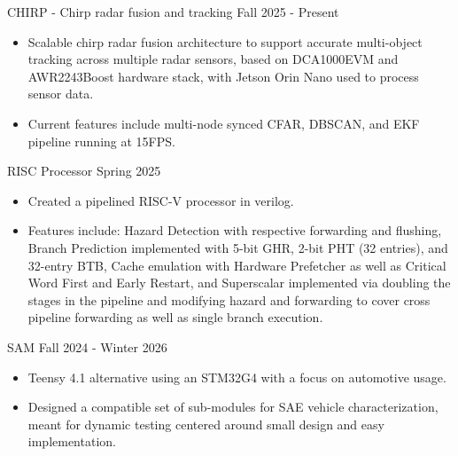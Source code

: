 \documentclass[9pt]{developercv} %
\begin{document}
\vspace{-16 pt}
\begin{entrylist}
    \entry
    {}
    {CHIRP - Chirp radar fusion and tracking }
    {Fall 2025 - Present}
    {\vspace{-4pt}
    \begin{itemize}[noitemsep,topsep=0pt,parsep=0pt,partopsep=0pt, leftmargin=10pt]
        \item Scalable chirp radar fusion architecture to support accurate multi-object tracking across multiple radar sensors, based on DCA1000EVM and AWR2243Boost hardware stack, with Jetson Orin Nano used to process sensor data. 
        \item Current features include multi-node synced CFAR, DBSCAN, and EKF pipeline running at 15FPS. 
    \end{itemize}
    }
    
    \entry
    {}
    {RISC Processor}
    {Spring 2025}
    {\vspace{-4pt}
    \begin{itemize}[noitemsep,topsep=0pt,parsep=0pt,partopsep=0pt, leftmargin=10pt]
    \item Created a pipelined RISC-V processor in verilog.
    \item Features include: Hazard Detection with respective forwarding and flushing, Branch Prediction implemented with  5-bit GHR, 2-bit PHT (32 entries), and 32-entry BTB, Cache emulation with Hardware Prefetcher as well as Critical Word First and Early Restart, and Superscalar implemented via doubling the stages in the pipeline and modifying hazard and forwarding to cover cross pipeline forwarding as well as single branch execution.
    \end{itemize}
    }

    \entry
    {}
    {SAM}
    {Fall 2024 - Winter 2026}
    {\vspace{-8pt}
    \begin{itemize}[noitemsep,topsep=0pt,parsep=0pt,partopsep=0pt, leftmargin=10pt]
    \item Teensy 4.1 alternative using an STM32G4 with a focus on automotive usage.
    \item Designed a compatible set of sub-modules for SAE vehicle characterization, meant for dynamic testing centered around small design and easy implementation. 
    \end{itemize}
    }
\end{entrylist}
\end{document}
